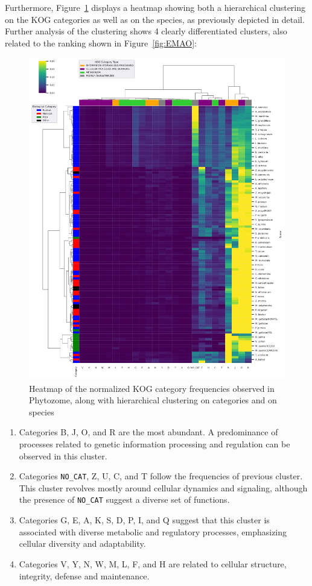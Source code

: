 Furthermore, Figure~\ref{fig:clustermap} displays a 
heatmap showing both a hierarchical clustering on the KOG 
categories as well as on the species, as previously depicted 
in detail. Further analysis of the clustering shows 4 clearly 
differentiated clusters, also related to the ranking shown in 
Figure~\ref{fig:EMAO}:

\begin{figure}[htp]
\centering
\includegraphics[width=\textwidth]{figures/clustermap}
\caption{Heatmap of the normalized KOG category frequencies 
observed in Phytozome, along with hierarchical clustering 
on categories and on species}
\label{fig:clustermap}
\end{figure}

\begin{enumerate}
\item Categories B, J, O, and R are the most abundant. A 
predominance of processes related to genetic information 
processing and regulation can be observed in this cluster.
\item Categories \verb|NO_CAT|, Z, U, C, and T follow the 
frequencies of previous cluster. This cluster revolves 
mostly around cellular dynamics and signaling, although the 
presence of \verb|NO_CAT| suggest a diverse set of functions.
\item Categories G, E, A, K, S, D, P, I, and Q suggest that 
this cluster is associated with diverse metabolic and 
regulatory processes, emphasizing cellular diversity and 
adaptability.
\item Categories V, Y, N, W, M, L, F, and H are related to 
cellular structure, integrity, defense and maintenance.
\end{enumerate}



